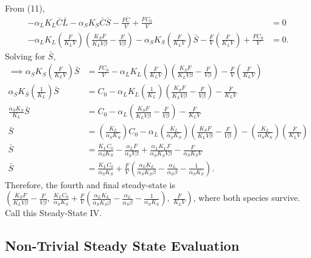 \begin{enumerate}
    From (11), 
    \begin{align*}
      -\alpha_L K_L \bar{C}\bar{L} -\alpha_S K_S \bar{C}\bar{S} - \frac{F\bar{C}}{V} + \frac{FC_0}{V} &= 0 \\
      -\alpha_L K_L \left( \frac{F}{K_L V} \right) \left( \frac{K_S F}{K_L V \beta} - \frac{F}{V \beta} \right) -\alpha_S K_S \left( \frac{F}{K_L V} \right) \bar{S} - \frac{F}{V} \left( \frac{F}{K_L V} \right) + \frac{FC_0}{V} &= 0.
    \end{align*}
    Solving for $\bar{S}$,
    \begin{align*}
      \implies \alpha_S K_S \left( \frac{F}{K_L V} \right) \bar{S} &=  \frac{FC_0}{V} - \alpha_L K_L \left( \frac{F}{K_L V} \right) \left( \frac{K_S F}{K_L V \beta} - \frac{F}{V \beta} \right) - \frac{F}{V} \left( \frac{F}{K_L V} \right) \\ 
      \alpha_S K_S \left( \frac{1}{K_L} \right) \bar{S} &=  C_0 - \alpha_L K_L \left( \frac{1}{K_L} \right) \left( \frac{K_S F}{K_L V \beta} - \frac{F}{V \beta} \right) - \frac{F}{K_L V} \\ 
      \frac{\alpha_S K_S}{K_L} \bar{S} &=  C_0 - \alpha_L \left( \frac{K_S F}{K_L V \beta} - \frac{F}{V \beta} \right) - \frac{F}{K_L V} \\ 
      \bar{S} &= \left( \frac{K_L}{\alpha_S K_S} \right) C_0 - \alpha_L \left( \frac{K_L}{\alpha_S K_S} \right) \left( \frac{K_S F}{K_L V \beta} - \frac{F}{V \beta} \right) - \left( \frac{K_L}{\alpha_S K_S} \right) \left( \frac{F}{K_L V} \right) \\ 
      \bar{S} &= \frac{K_L C_0}{\alpha_S K_S} - \frac{\alpha_L F}{\alpha_S V \beta} + \frac{\alpha_L K_L F}{\alpha_S K_S V \beta} - \frac{F}{\alpha_S K_S V} \\
      \bar{S} &= \frac{K_L C_0}{\alpha_S K_S} + \frac{F}{V} \left( \frac{\alpha_L K_L}{\alpha_S K_S \beta} - \frac{\alpha_L}{\alpha_S \beta} - \frac{1}{\alpha_S K_S} \right).
    \end{align*}
    Therefore, the fourth and final steady-state is {\color{red}$\left(\frac{K_S F}{K_L V \beta} - \frac{F}{V \beta},\ \frac{K_L C_0}{\alpha_S K_S} + \frac{F}{V} \left( \frac{\alpha_L K_L}{\alpha_S K_S \beta} - \frac{\alpha_L}{\alpha_S \beta} - \frac{1}{\alpha_S K_S} \right),\ \frac{F}{K_L V} \right)$}, where both species survive.  Call this {\color{red}Steady-State IV}. 
  \end{enumerate}

\subsection*{Non-Trivial Steady State Evaluation}

